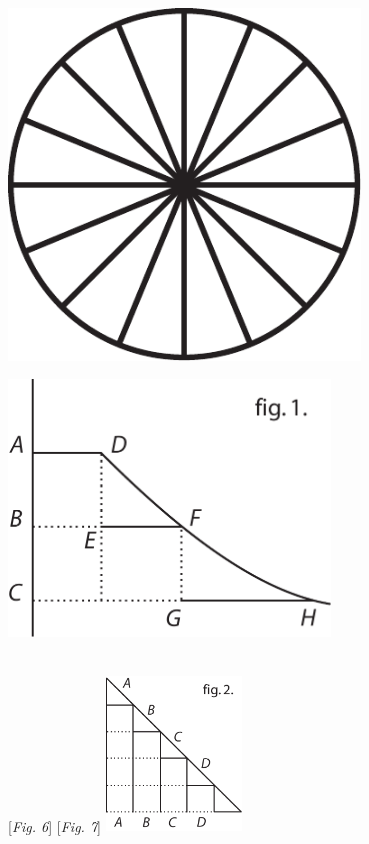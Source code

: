 \pend
\vspace{2.5em}
\pstart 
\begin{minipage}[c]{0.4\textwidth}
\includegraphics[trim = -25mm -6mm 0mm 0mm, clip, width=0.7\textwidth]{images/lh03705_011v-d1.pdf}
\end{minipage}
\hspace*{13,3mm}
\begin{minipage}[c]{0.6\textwidth}
\includegraphics[trim = 0mm -6mm 0mm 0mm, clip, width=0.64\textwidth]{images/lh03705_011v-d2.pdf}
\end{minipage}\\
\hspace*{24mm} [\textit{Fig. 6}]\hspace*{56mm} [\textit{Fig. 7}]
\pend
\newpage
\count{}
\count{}
\count{}
\pstart
\noindent
\centering
    \includegraphics[trim = 0mm -3mm 0mm -3mm, clip,width=0.27\textwidth]{images/lh03705_011v-d3.pdf}
